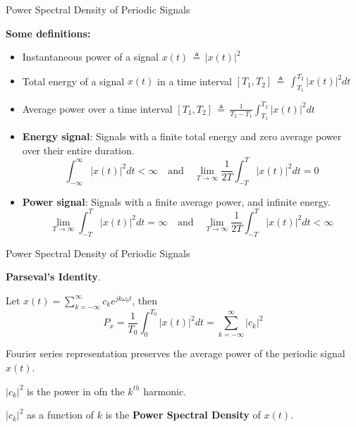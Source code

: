 \documentclass[aspectratio=169]{beamer}
\let\olditem\item
\renewcommand{\item}{\setlength{\itemsep}{\fill}\olditem}
\begin{document}
\begin{frame}[t]{Power Spectral Density of Periodic Signals}

\textbf{Some definitions:}
\vspace{0.1cm}
\begin{itemize}
  \item Instantaneous power of a signal $x(t) \, \triangleq \, \vert x(t) \vert^2$
  \vspace{0.25cm}

  \item Total energy of a signal $x(t)$ in a time interval $[T_1, T_2] \, \triangleq \, \int_{T_1}^{T_2}\vert x(t) \vert^2 dt $
  \vspace{0.25cm}

  \item Average power over a time interval $[T_1, T_2] \, \triangleq \, \frac{1}{T_2 - T_1}\int_{T_1}^{T_2}\vert x(t) \vert^2 dt $

  \item \textbf{Energy signal}: Signals with a finite total energy and zero average power over their entire duration.
  \[ \int_{-\infty}^{\infty} \vert x(t) \vert^2 dt < \infty \quad \text{and} \quad \lim_{T \to \infty} \frac{1}{2T}\int_{-T}^{T} \vert x(t) \vert^2 dt = 0 \]

  \item \textbf{Power signal}: Signals with a finite average power, and infinite energy.
  \[ \lim_{T \to \infty} \int_{-T}^{T} \vert x(t) \vert^2 dt = \infty \quad \text{and} \quad \lim_{T \to \infty} \frac{1}{2T}\int_{-T}^{T} \vert x(t) \vert^2 dt < \infty \]
\end{itemize}
\end{frame}


\begin{frame}[t]{Power Spectral Density of Periodic Signals}
\vspace{0.25cm}

\textbf{Parseval's Identity}.
\vspace{0.25cm}

Let $x(t) = \sum_{k=-\infty}^{\infty} c_k e^{jk\omega_0t}$, then
\[ P_x = \frac{1}{T_0} \int_{0}^{T_0} \vert x(t) \vert^2 dt = \sum_{k=-\infty}^{\infty} \vert c_k \vert^2 \]

\vspace{0.5cm}

Fourier series representation preserves the average power of the periodic signal $x(t)$.

\vspace{0.5cm}

$\vert c_k \vert^2$ is the power in ofn the $k^{th}$ harmonic.

\vspace{0.5cm}

$\vert c_k \vert^2$ as a function of $k$ is the \textbf{Power Spectral Density} of $x(t)$.
\end{frame}
\end{document}
